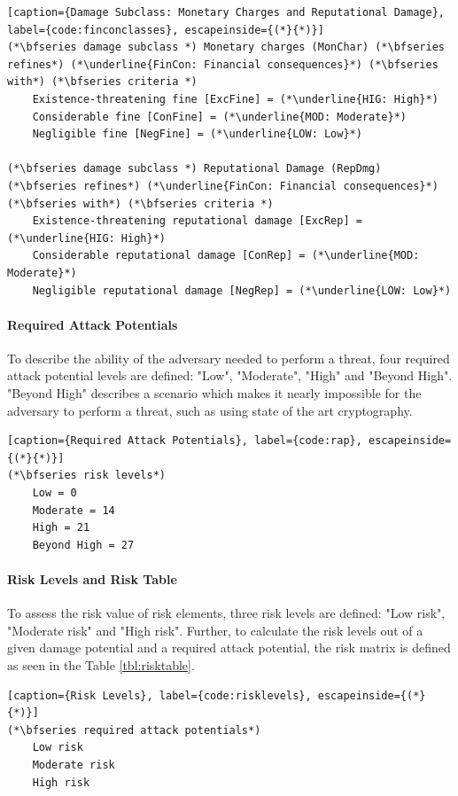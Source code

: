 \begin{lstlisting}[caption={Damage Subclass: Monetary Charges and Reputational Damage}, label={code:finconclasses}, escapeinside={(*}{*)}]
(*\bfseries damage subclass *) Monetary charges (MonChar) (*\bfseries refines*) (*\underline{FinCon: Financial consequences}*) (*\bfseries with*) (*\bfseries criteria *)
    Existence-threatening fine [ExcFine] = (*\underline{HIG: High}*)
    Considerable fine [ConFine] = (*\underline{MOD: Moderate}*)
    Negligible fine [NegFine] = (*\underline{LOW: Low}*)
    
(*\bfseries damage subclass *) Reputational Damage (RepDmg) (*\bfseries refines*) (*\underline{FinCon: Financial consequences}*) (*\bfseries with*) (*\bfseries criteria *)
    Existence-threatening reputational damage [ExcRep] = (*\underline{HIG: High}*)
    Considerable reputational damage [ConRep] = (*\underline{MOD: Moderate}*)
    Negligible reputational damage [NegRep] = (*\underline{LOW: Low}*)
\end{lstlisting}

\paragraph{Required Attack Potentials} To describe the ability of the adversary needed to perform a threat, four required attack potential levels are defined: "Low", "Moderate", "High" and "Beyond High". "Beyond High" describes a scenario which makes it nearly impossible for the adversary to perform a threat, such as using state of the art cryptography.

\begin{lstlisting}[caption={Required Attack Potentials}, label={code:rap}, escapeinside={(*}{*)}]
(*\bfseries risk levels*)
    Low = 0
    Moderate = 14
    High = 21
    Beyond High = 27
\end{lstlisting}


\paragraph{Risk Levels and Risk Table} To assess the risk value of risk elements, three risk levels are defined: "Low risk", "Moderate risk" and "High risk". Further, to calculate the risk levels out of a given damage potential and a required attack potential, the risk matrix is defined as seen in the Table \ref{tbl:risktable}.

\begin{lstlisting}[caption={Risk Levels}, label={code:risklevels}, escapeinside={(*}{*)}]
(*\bfseries required attack potentials*)
    Low risk
    Moderate risk
    High risk
\end{lstlisting}
	
